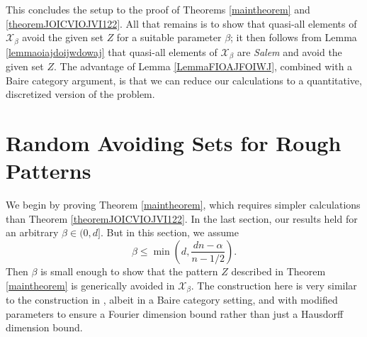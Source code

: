 \documentclass[dvipsnames,letterpaper,12pt]{article}
\numberwithin{equation}{section}
\numberwithin{theorem}{section}
\begin{document}
This concludes the setup to the proof of Theorems \ref{maintheorem} and \ref{theoremJOICVIOJVI122}. All that remains is to show that quasi-all elements of $\mathcal{X}_\beta$ avoid the given set $Z$ for a suitable parameter $\beta$; it then follows from Lemma \ref{lemmaoiajdoijwdowaj} that quasi-all elements of $\mathcal{X}_\beta$ are \emph{Salem} and avoid the given set $Z$. The advantage of Lemma \ref{LemmaFIOAJFOIWJ}, combined with a Baire category argument, is that we can reduce our calculations to a quantitative, discretized version of the problem.

\section{Random Avoiding Sets for Rough Patterns}

We begin by proving Theorem \ref{maintheorem}, which requires simpler calculations than Theorem \ref{theoremJOICVIOJVI122}. In the last section, our results held for an arbitrary $\beta \in (0,d]$. But in this section, we assume
%
\[ \beta \leq \min \left( d, \frac{dn - \alpha}{n - 1/2} \right). \]
%
Then $\beta$ is small enough to show that the pattern $Z$ described in Theorem \ref{maintheorem} is generically avoided in $\mathcal{X}_\beta$. The construction here is very similar to the construction in \cite{OurPaper}, albeit in a Baire category setting, and with modified parameters to ensure a Fourier dimension bound rather than just a Hausdorff dimension bound.
\end{document}
